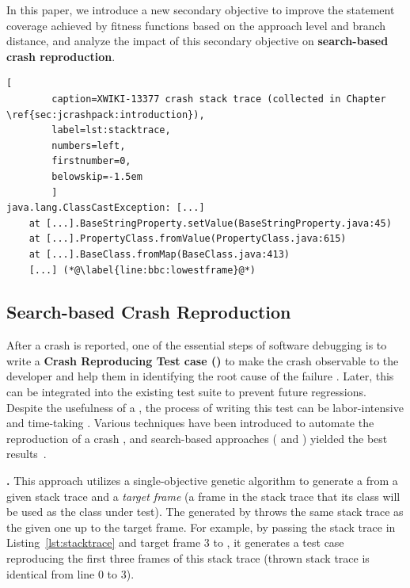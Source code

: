In this paper, we introduce a new secondary objective to improve the statement coverage achieved by fitness functions based on the approach level and branch distance, and analyze the impact of this secondary objective on \textbf{search-based crash reproduction}.

    \begin{lstlisting}[
        caption=XWIKI-13377 crash stack trace (collected in Chapter \ref{sec:jcrashpack:introduction}),
        label=lst:stacktrace,
        numbers=left,
        firstnumber=0,
        belowskip=-1.5em
        ]
java.lang.ClassCastException: [...]
    at [...].BaseStringProperty.setValue(BaseStringProperty.java:45)
    at [...].PropertyClass.fromValue(PropertyClass.java:615)
    at [...].BaseClass.fromMap(BaseClass.java:413)
    [...] (*@\label{line:bbc:lowestframe}@*)
    \end{lstlisting}

\subsection{Search-based Crash Reproduction}

After a crash is reported, one of the essential steps of software debugging is to write a \textbf{Crash Reproducing Test case (\CRT)} to make the crash observable to the developer and help them in identifying the root cause of the failure \cite{Zeller2009}. Later, this \CRT can be integrated into the existing test suite to prevent future regressions. Despite the usefulness of a \CRT, the process of writing this test can be labor-intensive and time-taking \cite{Soltani2018a}. 
Various techniques have been introduced to automate the reproduction of a crash \cite{Chen2015, Xuan2015, nayrolles2015jcharming, Rossler2013, Soltani2018a}, and search-based approaches (\evocrash \cite{Soltani2018a} and \recore \cite{Rossler2013}) yielded the best results~\cite{Soltani2018a}.


\textbf{\evocrash.}
This approach utilizes a single-objective genetic algorithm to generate a \CRT from a given stack trace and a \textit{target frame} (\ie a frame in the stack trace that its class will be used as the class under test). The \CRT generated by \evocrash throws the same stack trace as the given one up to the target frame. 
For example, by passing the stack trace in Listing~\ref{lst:stacktrace} and target frame 3 to \evocrash, it generates a test case reproducing the first three frames of this stack trace (\ie thrown stack trace is identical from line 0 to 3).

